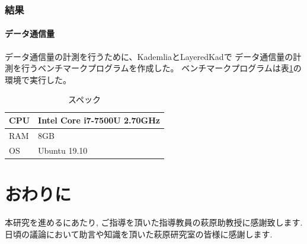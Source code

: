 \documentclass[sotsuron]{jcsie}
\begin{document}
\subsection{結果}
\subsubsection{データ通信量}
データ通信量の計測を行うために、KademliaとLayeredKadで
データ通信量の計測を行うベンチマークプログラムを作成した。
ベンチマークプログラムは表\ref{table:spec-note}の環境で実行した。

\begin{table}[H]
	\caption{スペック}	
	\centering
	\label{table:spec-note}
	\begin{tabular}{|l|l|}
		\hline
		CPU & 
		Intel Core i7-7500U 2.70GHz \\ \hline	
		RAM &
		8GB \\ \hline	
		OS &
		Ubuntu 19.10 \\ \hline
	\end{tabular}	
\end{table}

\chapter{おわりに}
\begin{acknowledgment}
	本研究を進めるにあたり, ご指導を頂いた指導教員の萩原助教授に感謝致します.
	日頃の議論において助言や知識を頂いた萩原研究室の皆様に感謝します.
\end{acknowledgment}
\nocite{*}


\end{document}
